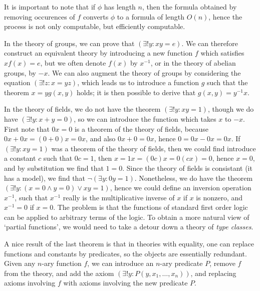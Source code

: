 It is important to note that if $\phi$ has length $n$, then the formula obtained by removing occurences of $f$ converts $\phi$ to a formula of length $O(n)$, hence the process is not only computable, but efficiently computable.

\begin{example}
    In the theory of groups, we can prove that $(\exists ! y: x y = e)$. We can therefore construct an equivalent theory by introducing a new function $f$ which satisfies $x f(x) = e$, but we often denote $f(x)$ by $x^{-1}$, or in the theory of abelian groups, by $-x$. We can also augment the theory of groups by considering the equation $(\exists ! z : x = yz)$, which leads us to introduce a function $g$ such that the theorem $x = y g(x,y)$ holds; it is then possible to derive that $g(x,y) = y^{-1} x$.
\end{example}

\begin{example}
    In the theory of fields, we do not have the theorem $(\exists ! y : x y = 1)$, though we do have $(\exists ! y : x + y = 0)$, so we can introduce the function which takes $x$ to $-x$. First note that $0 x = 0$ is a theorem of the theory of fields, because $0 x + 0 x = (0 + 0) x = 0 x$, and also $0 x + 0 = 0 x$, hence $0 = 0 x - 0 x = 0 x$. If $(\exists ! y : x y = 1)$ was a theorem of the theory of fields, then we could find introduce a constant $c$ such that $0 c = 1$, then $x = 1 x = (0 c) x = 0 (c x) = 0$, hence $x = 0$, and by substitution we find that $1 = 0$. Since the theory of fields is consistant (it has a model), we find that $\neg (\exists y: 0 y = 1)$. Nonetheless, we do have the theorem $(\exists ! y: (x = 0 \wedge y = 0) \vee x y = 1)$, hence we could define an inversion operation $x^{-1}$, such that $x^{-1}$ really is the multiplicative inverse of $x$ if $x$ is nonzero, and $x^{-1} = 0$ if $x = 0$. The problem is that the functions of standard first order logic can be applied to arbitrary terms of the logic. To obtain a more natural view of `partial functions', we would need to take a detour down a theory of \emph{type classes}.
\end{example}

A nice result of the last theorem is that in theories with equality, one can replace functions and constants by predicates, so the objects are essentially redundant. Given any $n$-ary function $f$, we can introduce an $n$-ary predicate $P$, remove $f$ from the theory, and add the axiom $(\exists ! y: P(y,x_1,\dots,x_n))$, and replacing axioms involving $f$ with axioms involving the new predicate $P$.


